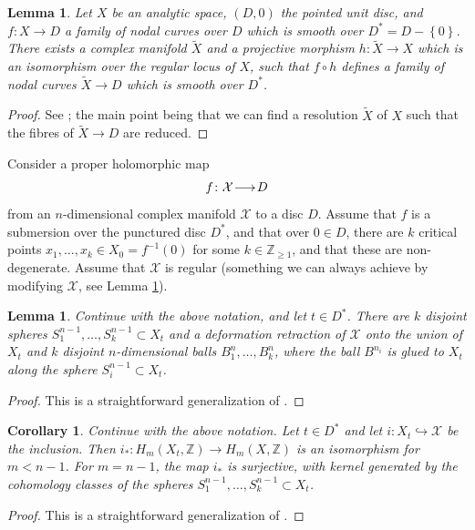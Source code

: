 \documentclass[a4paper,11pt,reqno]{amsart}
\makeatletter
\numberwithin{equation}{section}
\theoremstyle{plain}
\newtheorem{corollary}[theorem]{Corollary}
\newtheorem{lemma}[theorem]{Lemma}
\theoremstyle{definition}
\newcommand{\Z}{\mathbb Z}
\newcommand{\ca}[1]{{\mathcal{#1}}}
\renewcommand{\longrightarrow}{\xymatrix@1@=15pt{\ar[r]&}}
\newcommand{\set}[1]{\left\{ #1 \right\}}
\makeatother
\begin{document}
\begin{lemma}\label{lemma:dejong}
    Let $X$ be an analytic space, $(D, 0)$ the pointed unit disc, and $f \colon X \to D$ a family of nodal curves over $D$ which is smooth over $D^\ast = D - \set{0}$. There exists a complex manifold $\widetilde X$ and a projective morphism $h \colon \widetilde X \to X$ which is an isomorphism over the regular locus of $X$, such that $f \circ h$ defines a family of nodal curves $ \widetilde X \to D$ which is smooth over $D^\ast$. 
\end{lemma}
\begin{proof}
See \cite[Lemma 3.2]{dejong-alterations}; the main point being that we can find  a resolution $\widetilde X$ of $X$ such that the fibres of $\widetilde X\to D$ are reduced.
\end{proof}
Consider a proper holomorphic map $$f\colon\ca X\longrightarrow D $$ from an $n$-dimensional complex manifold $\ca X$ to a disc $D$. Assume that $f$ is a submersion over the punctured disc $D^\ast$, and that over $0 \in D$, there are $k$ critical points $x_{1}, \dotsc, x_{k} \in X_0 =  f^{-1}(0)$ for some $k \in \Z_{\geq 1}$, and that these are non-degenerate. Assume that $\ca X$ is regular (something we can always achieve by modifying $\ca X$, see Lemma \ref{lemma:dejong}). 

\begin{lemma} \label{lemma:voisin-i}
Continue with the above notation, and let $t \in D^\ast$. There are $k$ disjoint spheres $S_1^{n-1}, \dotsc, S_k^{n-1} \subset X_t$ and
    a deformation retraction of $\ca X$ onto the union of $X_t$ and $k$ disjoint $n$-dimensional balls $B^n_1, \dotsc, B^n_k$, where the ball $B^{n_i}$ is glued to $X_t$ along the sphere $S^{n-1}_i \subset X_t$. 
\end{lemma}
\begin{proof}
    This is a straightforward generalization of \cite[Theorem 2.16]{voisin-II}. 
\end{proof}

\begin{corollary} \label{corollary:voisin-ii}
Continue with the above notation. Let $t \in D^\ast$ and let $i:X_t \hookrightarrow \ca X$ be the inclusion. Then $i_\ast \colon H_m(X_t,\Z) \to H_m(X,\Z)$ is an isomorphism for $m < n-1$. For $m = n-1$, the map $i_\ast$ is surjective, with kernel generated by the cohomology classes 
of the spheres $S^{n-1}_1, \dotsc, S^{n-1}_k \subset X_t$. 
\end{corollary}

\begin{proof} 
    This is a straightforward generalization of \cite[Corollary 2.17]{voisin-II}. 
\end{proof}
\end{document}
